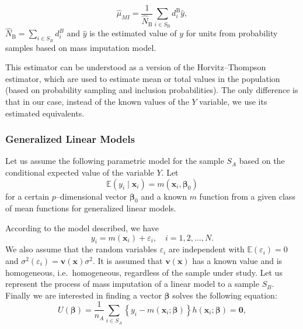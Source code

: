 \documentclass[
]{jss}
\begin{document}
\begin{equation}
\hat{\mu}_{M I}=\frac{1}{\hat{N}_{\mathrm{B}}} \sum_{i \in S_{\mathrm{B}}} d_i^{\mathrm{B}} \hat{y}, 
\end{equation} \(\hat{N}_{\mathrm{B}} = \sum_{i \in S_B} d_i^B\) and
\(\hat{y}\) is the estimated value of \(y\) for units from probability
samples based on mass imputation model.

This estimator can be understood as a version of the Horvitz--Thompson
estimator, which are used to estimate mean or total values in the
population (based on probability sampling and inclusion probabilities).
The only difference is that in our case, instead of the known values of
the \(Y\) variable, we use its estimated equivalents.

\subsubsection{Generalized Linear
Models}\label{generalized-linear-models}

Let us assume the following parametric model for the sample \(S_A\)
based on the conditional expected value of the variable \(Y\). Let
\begin{equation}
\mathbb{E}\left(y_i \mid \boldsymbol{x}_i\right)=m\left(\boldsymbol{x}_i, \boldsymbol{\beta}_0\right)
\end{equation} for a certain \(p\)--dimensional vector
\(\boldsymbol{\beta}_0\) and a known \(m\) function from a given class
of mean functions for generalized linear models.

According to the model described, we have \[
y_i=m\left(\boldsymbol{x}_i\right)+\varepsilon_i, \quad i=1,2, \ldots, N.
\] We also assume that the random variables \(\varepsilon_i\) are
independent with \(\mathbb{E} \left(\varepsilon_i \right) = 0\) and
\(\sigma^2 \left(\varepsilon_i \right) = \mathbf{v} \left(\boldsymbol{x}\right) \sigma^2\).
It is assumed that \(\mathbf{v} \left(\boldsymbol{x}\right)\) has a
known value and is homogeneous, i.e.~homogeneous, regardless of the
sample under study. Let us represent the process of mass imputation of a
linear model to a sample \(S_B\). Finally we are interested in finding a
vector \(\boldsymbol{\beta}\) solves the following equation:
\begin{equation}
\label{eq-2.3}
U(\boldsymbol{\beta})=\frac{1}{n_A} \sum_{i \in S_A}\left\{y_i-m\left(\boldsymbol{x}_i ; \boldsymbol{\beta}\right)\right\} h\left(\boldsymbol{x}_i ; \boldsymbol{\beta}\right)=\mathbf{0},
\end{equation}
\end{document}
